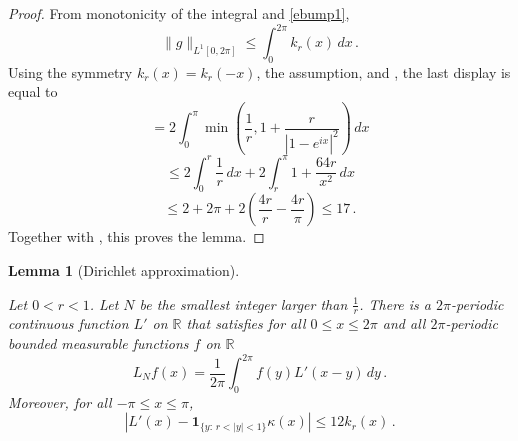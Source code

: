 \documentclass[10pt,a4paper]{article}
\theoremstyle{plain}
\newtheorem{lemma}[theorem]{Lemma}
\theoremstyle{definition}
\numberwithin{equation}{subsection}
\newcommand{\R}{{\mathbb{R}}}
\newcommand{\lean}[1]{}
\newcommand{\uses}[1]{}
\newcommand{\leanok}{}
\begin{document}
\begin{proof}
\leanok
From monotonicity of the integral and \eqref{ebump1},
\begin{equation}
    \|g\|_{L^1[0, 2\pi]} \le \int_0^{2\pi}k_r(x)\, dx\,.
\end{equation}
Using the symmetry
$k_r(x)=k_r(-x)$, the assumption, and , the last display
is equal to
\begin{equation*}
    = 2 \int_0^\pi \min\left(\frac 1r, 1+\frac r{|1-e^{ix}|^2}\right)\, dx
\end{equation*}
\begin{equation*}
    \le 2\int_0^{r} \frac 1r \, dx+2\int_r^{\pi}1+\frac {64r}{x^2}\, dx
\end{equation*}
\begin{equation}
    \le 2+2\pi + 2\left(\frac {4r}r-\frac {4r}{\pi}\right)
    \le 17\, .
\end{equation}
    Together with , this proves the lemma.
\end{proof}

\begin{lemma}[Dirichlet approximation]\label{Dirichlet-approximation}
\uses{Dirichlet-kernel,lower-secant-bound}
\leanok
\lean{continuous_dirichletApprox, periodic_dirichletApprox, approxHilbertTransform_eq_dirichletApprox, dist_dirichletApprox_le}
Let $0<r<1$. Let $N$ be the smallest
integer larger than $\frac 1r$.
There is a $2\pi$-periodic continuous function
 ${L'}$ on $\R$ that satisfies for all $0\le x\le 2\pi$
and all $2\pi$-periodic bounded measurable functions $f$ on $\R$
\begin{equation}\label{lthroughlprime}
    L_Nf(x)=\frac 1{2\pi}\int_{0}^{2\pi}f(y) {L'}(x-y)\, dy\,.
\end{equation}
Moreover, for all $-\pi \le x \le \pi$,
\begin{equation}\label{eqdifflhil}
    \left|L'(x)-\mathbf{1}_{\{y:\, r<|y|<1\}} \kappa(x)\right|\le 12 k_r(x)\, .
\end{equation}
\end{lemma}
\end{document}
